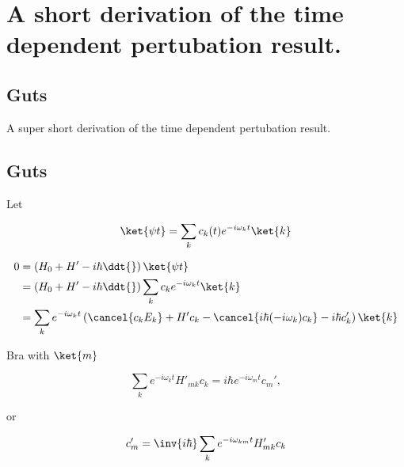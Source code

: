 
%

\chapter{A short derivation of the time dependent pertubation result.}
\label{chap:shortTimeDepPertubation}
{}
\date{Dec XX, 2011}

\beginArtWithToc

\section{Guts}

A super short derivation of the time dependent pertubation result.

\section{Guts}

Let

\begin{equation}\label{eqn:shortTimeDepPertubation:n}
\ket{\psi{t}} = \sum_k c_k(t) e^{-i\omega_k t} \ket{k}
\end{equation}

\begin{align*}
0
&=
\left( H_0 + H' - i\hbar \ddt{} \right)
\ket{\psi{t}} \\
&=
\left( H_0 + H' - i\hbar \ddt{} \right)
\sum_k c_k e^{-i\omega_k t} \ket{k} \\
&=
\sum_k e^{-i\omega_k t} 
\left(
\cancel{c_k E_k} + H' c_k - \cancel{i\hbar (-i \omega_k) c_k} -i\hbar c_k'
\right)
\ket{k}
\end{align*}

Bra with $\ket{m}$

\begin{equation}\label{eqn:shortTimeDepPertubation:n}
\sum_k e^{-i\omega_k t} 
H'_{mk} c_k 
=
i\hbar
e^{-i\omega_m t} 
c_m',
\end{equation}

or

\begin{equation}\label{eqn:shortTimeDepPertubation:n}
c_m'
=
\inv{i\hbar}
\sum_k e^{-i\omega_{km} t} 
H'_{mk} c_k 
\end{equation}

\EndArticle
